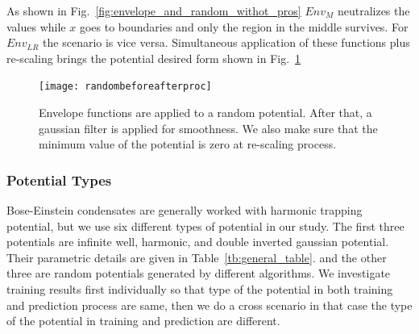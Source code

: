 \documentclass[a4paper,times,hidelinks,12pt]{article}
\begin{document}
As shown in Fig.~\ref{fig:envelope_and_random_withot_pros} $Env_{M}$ neutralizes the values while $x$ goes to boundaries and only the region in the middle survives. For $Env_{LR}$ the scenario is vice versa. Simultaneous application of these functions plus re-scaling brings the potential desired form shown in Fig.~\ref{fig:random_plus_envelope}


\graphicspath{{"../figs/potentials/"}}
\begin{figure}[H]
    \texttt{[image: randombeforeafterproc]}
\caption{Envelope functions are applied to a random potential. After that, a gaussian filter is applied for smoothness. We also make sure that the minimum value of the potential is zero at re-scaling process.}
\label{fig:random_plus_envelope}
\end{figure}





\subsubsection{Potential Types}

Bose-Einstein condensates are generally worked with harmonic trapping potential, but we use six different types of potential in our study. The first three potentials are infinite well, harmonic, and double inverted gaussian potential. Their parametric details are given in Table~\ref{tb:general_table}. and the other three are random potentials generated by different algorithms. We investigate training results first individually so that type of the potential in both training and prediction process are same, then we do a cross scenario in that case the type of the potential in training and prediction are different.

\newcommand{\infinitewell}{$
V(x) = 
    \begin{cases}
       0 &\quad\text{if } x_l < x < x_r  \\
       \infty &\quad\text{if } \textit{otherwise} \\
    \end{cases}
$}

\newcommand{\harmonicpot}{$ V(x) =  \frac{1}{2}m \omega^2 (x - x_0) ^2 $}
\newcommand{\gaussianpot}{$V(x) = -A_1 \exp(\frac{(x - \mu_1)^2}{\sigma_1^2}) -A_2 \exp(\frac{(x - \mu_2)^2}{\sigma_2^2})$}
\newcommand{\randomexplation}{Damping high frequencies in Fourier space, and inverse transformation}
\newcommand{\envelopepotLR}{$\text{Env}_{LR}(x) = [(1 + \tanh{(\beta(x + x_L))}) + (1 - \tanh{(\beta(x + x_R))})]/2$}
\newcommand{\envelopepotM}{$\text{Env}_{M}(x) = 1 - \text{Env}_{LR}(x)$}
\newcommand{\randompotONE}{$V(x_{i+1}) = V(x_i) + [X\sim\mathcal{N}(\mu, \sigma)$]}
\end{document}
